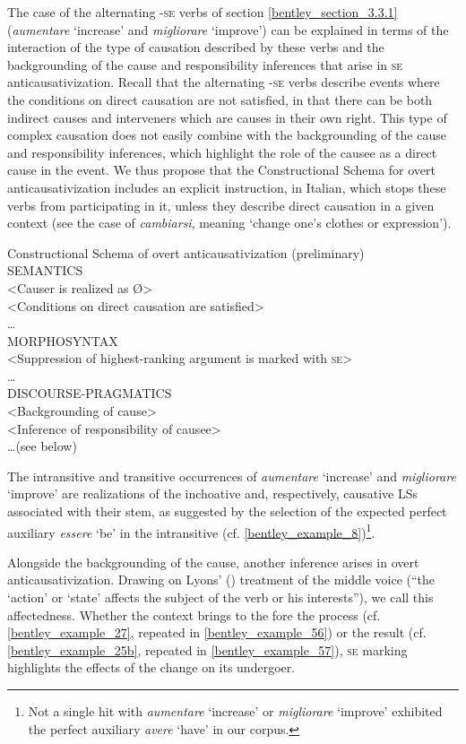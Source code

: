 \documentclass[output=paper,colorlinks,citecolor=brown
]{langscibook}
\begin{document}
The case of the alternating -\textsc{se} verbs of section \ref{bentley_section_3.3.1} (\textit{aumentare} ‘increase’ and \textit{migliorare} ‘improve’) can be explained in terms of the interaction of the type of causation described by these verbs and the backgrounding of the cause and responsibility inferences that arise in \textsc{se} anticausativization. Recall that the alternating -\textsc{se} verbs describe events where the conditions on direct causation are not satisfied, in that there can be both indirect causes and interveners which are causes in their own right. This type of complex causation does not easily combine with the backgrounding of the cause and responsibility inferences, which highlight the role of the causee as a direct cause in the event. We thus propose that the Constructional Schema for overt anticausativization includes an explicit instruction, in Italian, which stops these verbs from participating in it, unless they describe direct causation in a given context (see the case of \textit{cambiarsi}, meaning ‘change one’s clothes or expression’).

\ea \label{bentley_example_54}
Constructional Schema of overt anticausativization (preliminary)\\
SEMANTICS\\
<Causer is realized as Ø>\\
<Conditions on direct causation are satisfied>\\
 \ldots \\
MORPHOSYNTAX\\
<Suppression of highest-ranking argument is marked with \textsc{se}>\\
 \ldots \\
DISCOURSE-PRAGMATICS\\
<Backgrounding of cause>\\
<Inference of responsibility of causee>\\
 \ldots  (see below)
\z

The intransitive and transitive occurrences of \textit{aumentare} ‘increase’ and \textit{migliorare} ‘improve’ are realizations of the inchoative and, respectively, causative LSs associated with their stem, as suggested by the selection of the expected perfect auxiliary \textit{essere} ‘be’ in the intransitive (cf. \ref{bentley_example_8})\footnote{Not a single hit with \textit{aumentare} ‘increase’ or \textit{migliorare} ‘improve’ exhibited the perfect auxiliary \textit{avere} ‘have’ in our corpus.}. 

Alongside the backgrounding of the cause, another inference arises in overt anticausativization. Drawing on Lyons’ (\citeyear[373]{lyons1969introduction}) treatment of the middle voice (“the ‘action’ or ‘state’ affects the subject of the verb or his interests”), we call this affectedness. Whether the context brings to the fore the process (cf. \ref{bentley_example_27}, repeated in \ref{bentley_example_56}) or the result (cf. \ref{bentley_example_25b}, repeated in \ref{bentley_example_57}), \textsc{se} marking highlights the effects of the change on its undergoer. 
\end{document}
